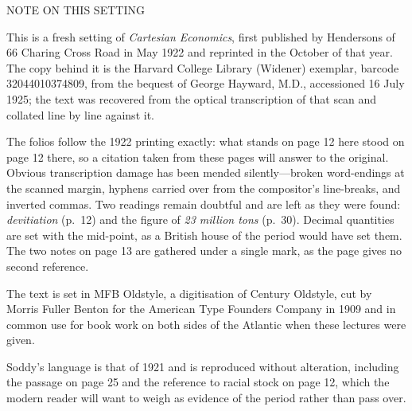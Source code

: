 \documentclass[10.5pt,twoside]{book}
\begin{document}
\clearpage
\pagestyle{empty}
\null\vfill
\begin{center}
{\footnotesize NOTE ON THIS SETTING}
\end{center}
\vspace{10pt}
{\footnotesize\linespread{1.05}\selectfont
\noindent This is a fresh setting of \textit{Cartesian Economics}, first
published by Hendersons of 66 Charing Cross Road in May 1922 and reprinted in
the October of that year. The copy behind it is the Harvard College Library
(Widener) exemplar, barcode 32044010374809, from the bequest of George
Hayward, M.D., accessioned 16 July 1925; the text was recovered from the
optical transcription of that scan and collated line by line against it.\par
\medskip
The folios follow the 1922 printing exactly: what stands on page 12 here stood
on page 12 there, so a citation taken from these pages will answer to the
original. Obvious transcription damage has been mended silently---broken
word-endings at the scanned margin, hyphens carried over from the compositor's
line-breaks, and inverted commas. Two readings remain doubtful and are left as
they were found: \textit{devitiation} (p.\ 12) and the figure of \textit{23
million tons} (p.\ 30). Decimal quantities are set with the mid-point, as a
British house of the period would have set them. The two notes on page 13 are
gathered under a single mark, as the page gives no second reference.\par
\medskip
The text is set in MFB Oldstyle, a digitisation of Century Oldstyle, cut by
Morris Fuller Benton for the American Type Founders Company in 1909 and in
common use for book work on both sides of the Atlantic when these lectures
were given.\par
\medskip
Soddy's language is that of 1921 and is reproduced without alteration,
including the passage on page 25 and the reference to racial stock on page 12,
which the modern reader will want to weigh as evidence of the period rather
than pass over.}
\vfill
\clearpage
\end{document}
